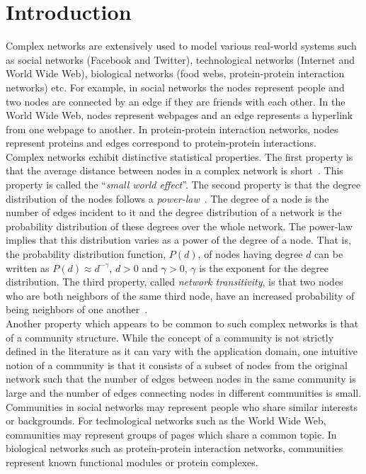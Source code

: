 \chapter{Introduction}\label{intro}
\pagestyle{myheadings}
\begin{spacing}{1.5}
Complex networks are extensively used to model various real-world systems such as social networks (Facebook and Twitter), technological networks (Internet and World Wide Web), biological networks (food webs, protein-protein interaction networks) etc. For example, in social networks the nodes represent people and two nodes are connected by an edge if they are friends with each other. In the World Wide Web,  nodes represent webpages and an edge represents a hyperlink from one webpage to another. In protein-protein interaction networks, nodes represent proteins and edges correspond to protein-protein interactions.\\
\indent Complex networks exhibit distinctive statistical properties. The first property is that the average distance between nodes in a complex network is short~\cite{milgram67smallworld}. This property is called the ``\emph{small world effect}''. The second property is that the degree distribution of the nodes follows a \emph{power-law}~\cite{Barabasi99emergenceScaling}. The degree of a node is the number of edges incident to it and the degree distribution of a network is the probability distribution of these degrees over the whole network. The power-law implies that this distribution varies as a power of the degree of a node. That is, the probability distribution function, $P(d)$, of nodes having degree $d$ can be written as $P(d) \approx d^{-\gamma}$, $d > 0$ and $\gamma > 0$, $\gamma$ is the exponent for the degree distribution. The third property, called \emph{network transitivity}, is that two nodes who are both neighbors of the same third node, have an increased probability of being neighbors of one another~\cite{Watts-Colective-1998}.\\
\indent Another property which appears to be common to such complex networks is that of a community structure. While the concept of a community is not strictly defined in the literature as it can vary with the application domain, one intuitive notion of a community is that it consists of a subset of nodes from the original network such that the number of edges between nodes in the same community is large and the number of edges connecting nodes in different communities is small. Communities in social networks may represent people who share similar interests or backgrounds. For technological networks such as the World Wide Web, communities may represent groups of pages which share a common topic. In biological networks such as protein-protein interaction networks, communities represent known functional modules or protein complexes.\\

\end{spacing}

